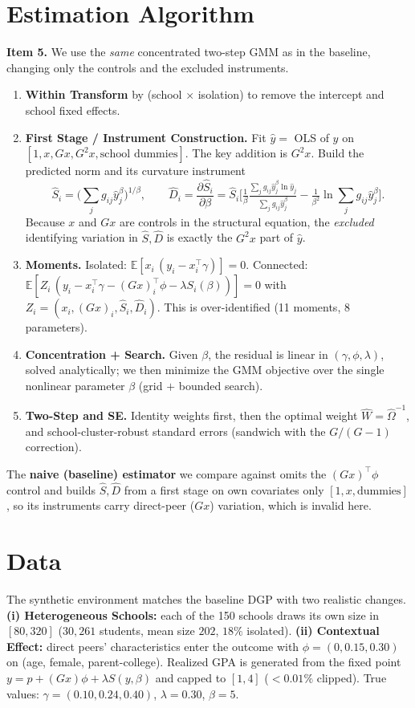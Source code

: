 \documentclass[11pt]{article}
\newcommand{\E}{\mathbb{E}}\newcommand{\T}{^{\!\top}}
\renewcommand{\_}{\textunderscore\allowbreak}
\begin{document}
\section{Estimation Algorithm}
\textbf{Item 5.} We use the \emph{same} concentrated two-step GMM as in the baseline, changing only the controls and the excluded instruments.
\begin{enumerate}[leftmargin=1.4em,itemsep=1pt,topsep=2pt]
\item \textbf{Within Transform} by (school $\times$ isolation) to remove the intercept and school fixed effects.
\item \textbf{First Stage / Instrument Construction.} Fit $\widehat y=$ OLS of $y$ on $[1,x,Gx,G^2x,\text{school dummies}]$. The key addition is $G^2x$. Build the predicted norm and its curvature instrument
\[
\widehat S_i=\Big(\textstyle\sum_j g_{ij}\widehat y_j^{\beta}\Big)^{1/\beta},\qquad
\widehat D_i=\frac{\partial \widehat S_i}{\partial\beta}
=\widehat S_i\Big[\tfrac1\beta\tfrac{\sum_j g_{ij}\widehat y_j^{\beta}\ln\widehat y_j}{\sum_j g_{ij}\widehat y_j^{\beta}}-\tfrac1{\beta^2}\ln\!\textstyle\sum_j g_{ij}\widehat y_j^{\beta}\Big].
\]
Because $x$ and $Gx$ are controls in the structural equation, the \emph{excluded} identifying variation in $\widehat S,\widehat D$ is exactly the $G^2x$ part of $\widehat y$.
\item \textbf{Moments.} Isolated: $\E[x_i\,(y_i-x_i\T\gamma)]=0$. Connected: $\E[Z_i\,(y_i-x_i\T\gamma-(Gx)_i\T\phi-\lambda S_i(\beta))]=0$ with $Z_i=(x_i,(Gx)_i,\widehat S_i,\widehat D_i)$. This is over-identified (11 moments, 8 parameters).
\item \textbf{Concentration + Search.} Given $\beta$, the residual is linear in $(\gamma,\phi,\lambda)$, solved analytically; we then minimize the GMM objective over the single nonlinear parameter $\beta$ (grid $+$ bounded search).
\item \textbf{Two-Step and SE.} Identity weights first, then the optimal weight $\widehat W=\widehat\Omega^{-1}$, and school-cluster-robust standard errors (sandwich with the $G/(G-1)$ correction).
\end{enumerate}
The \textbf{naive (baseline) estimator} we compare against omits the $(Gx)\T\phi$ control and builds $\widehat S,\widehat D$ from a first stage on own covariates only $[1,x,\text{dummies}]$, so its instruments carry direct-peer ($Gx$) variation, which is invalid here.

\section{Data}
The synthetic environment matches the baseline DGP with two realistic changes. \textbf{(i) Heterogeneous Schools:} each of the 150 schools draws its own size in $[80,320]$ ($30{,}261$ students, mean size $202$, $18\%$ isolated). \textbf{(ii) Contextual Effect:} direct peers' characteristics enter the outcome with $\phi=(0,0.15,0.30)$ on (age, female, parent-college). Realized GPA is generated from the fixed point $y=p+(Gx)\phi+\lambda S(y,\beta)$ and capped to $[1,4]$ ($<0.01\%$ clipped). True values: $\gamma=(0.10,0.24,0.40)$, $\lambda=0.30$, $\beta=5$.
\end{document}
